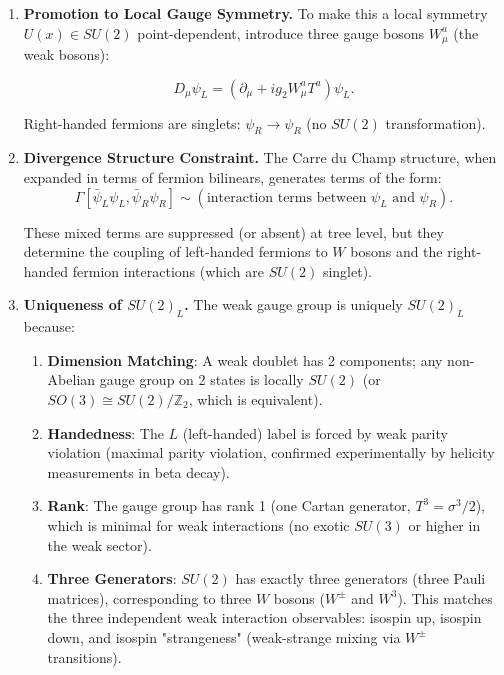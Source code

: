 \begin{enumerate}
This is an accidental symmetry of the tree-level Lagrangian (not imposed by hand, but emerging from the structure of kinetic terms and mass hierarchies).

\item \textbf{Promotion to Local Gauge Symmetry.} To make this a local symmetry $U(x) \in SU(2)$ point-dependent, introduce three gauge bosons $W_\mu^a$ (the weak bosons):

\begin{equation}
D_\mu \psi_L = (\partial_\mu + i g_2 W_\mu^a T^a) \psi_L.
\end{equation}

Right-handed fermions are singlets: $\psi_R \to \psi_R$ (no $SU(2)$ transformation).

\item \textbf{Divergence Structure Constraint.} The Carre du Champ structure, when expanded in terms of fermion bilinears, generates terms of the form:
\begin{equation}
\Gamma[\bar{\psi}_L \psi_L, \bar{\psi}_R \psi_R] \sim (\text{interaction terms between } \psi_L \text{ and } \psi_R).
\end{equation}

These mixed terms are suppressed (or absent) at tree level, but they determine the coupling of left-handed fermions to $W$ bosons and the right-handed fermion interactions (which are $SU(2)$ singlet).

\item \textbf{Uniqueness of $SU(2)_L$.} The weak gauge group is uniquely $SU(2)_L$ because:

\begin{enumerate}[label=(\roman*)]
\item \textbf{Dimension Matching}: A weak doublet has 2 components; any non-Abelian gauge group on 2 states is locally $SU(2)$ (or $SO(3) \cong SU(2)/\mathbb{Z}_2$, which is equivalent).

\item \textbf{Handedness}: The $L$ (left-handed) label is forced by weak parity violation (maximal parity violation, confirmed experimentally by helicity measurements in beta decay).

\item \textbf{Rank}: The gauge group has rank 1 (one Cartan generator, $T^3 = \sigma^3/2$), which is minimal for weak interactions (no exotic $SU(3)$ or higher in the weak sector).

\item \textbf{Three Generators}: $SU(2)$ has exactly three generators (three Pauli matrices), corresponding to three $W$ bosons ($W^\pm$ and $W^3$). This matches the three independent weak interaction observables: isospin up, isospin down, and isospin "strangeness" (weak-strange mixing via $W^\pm$ transitions).
\end{enumerate}

\end{enumerate}

